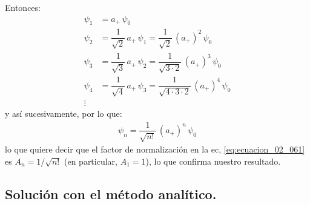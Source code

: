 \documentclass[12pt]{article}
\numberwithin{equation}{section}
\begin{document}
Entonces:
\begin{align*}
\psi_{1} &= a_{+} \, \psi_{0} \\[0.5em]
\psi_{2} &= \dfrac{1}{\sqrt{2}} \, a_{+} \, \psi_{1} = \dfrac{1}{\sqrt{2}} \, (a_{+})^{2} \, \psi_{0} \\[0.5em]
\psi_{3} &= \dfrac{1}{\sqrt{3}} \, a_{+} \, \psi_{2} = \dfrac{1}{\sqrt{3 \cdot 2}} \, (a_{+})^{3} \, \psi_{0} \\[0.5em]
\psi_{4} &= \dfrac{1}{\sqrt{4}} \, a_{+} \, \psi_{3} = \dfrac{1}{\sqrt{4 \cdot 3 \cdot 2}} \, (a_{+})^{4} \, \psi_{0} \\[0.5em]
\vdots
\end{align*}
y así sucesivamente, por lo que:
\begin{align}
\psi_{n} = \dfrac{1}{\sqrt{n!}} \, (a_{+})^{n} \, \psi_{0}
\label{eq:ecuacion_02_067}
\end{align}
lo que quiere decir que el factor de normalización en la ec, \ref{eq:ecuacion_02_061} es $A_{n} = 1 / \sqrt{n!}$  (en particular, $A_{1} = 1$), lo que confirma nuestro resultado.

\subsection{Solución con el método analítico.}
\end{document}
